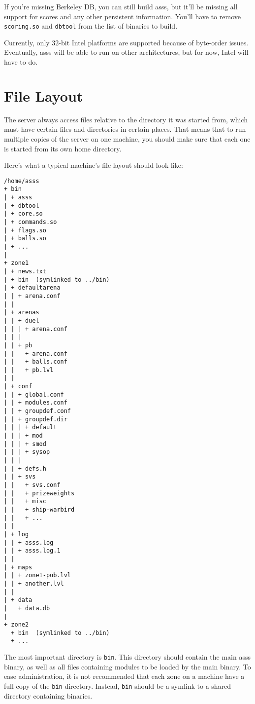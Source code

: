 \documentclass{article}
\newcommand{\asss}{asss}
\begin{document}
If you're missing Berkeley DB, you can still build \asss{}, but it'll be
missing all support for scores and any other persistent information.
You'll have to remove \verb/scoring.so/ and \verb/dbtool/ from the list
of binaries to build.

Currently, only 32-bit Intel platforms are supported because of
byte-order issues. Eventually, \asss{} will be able to run on other
architectures, but for now, Intel will have to do.


%
%
%


\section{File Layout}
The server always access files relative to the directory it was started
from, which must have certain files and directories in certain places.
That means that to run multiple copies of the server on one machine, you
should make sure that each one is started from its own home directory.

Here's what a typical machine's file layout should look like:
\begin{verbatim}
/home/asss
+ bin
| + asss
| + dbtool
| + core.so
| + commands.so
| + flags.so
| + balls.so
| + ...
|
+ zone1
| + news.txt
| + bin  (symlinked to ../bin)
| + defaultarena
| | + arena.conf
| |
| + arenas
| | + duel
| | | + arena.conf
| | |
| | + pb
| |   + arena.conf
| |   + balls.conf
| |   + pb.lvl
| |
| + conf
| | + global.conf
| | + modules.conf
| | + groupdef.conf
| | + groupdef.dir
| | | + default
| | | + mod
| | | + smod
| | | + sysop
| | |
| | + defs.h
| | + svs
| |   + svs.conf
| |   + prizeweights
| |   + misc
| |   + ship-warbird
| |   + ...
| |
| + log
| | + asss.log
| | + asss.log.1
| |
| + maps
| | + zone1-pub.lvl
| | + another.lvl
| |
| + data
|   + data.db
|
+ zone2
  + bin  (symlinked to ../bin)
  + ...
\end{verbatim}

The most important directory is \verb/bin/. This directory should
contain the main \asss{} binary, as well as all files containing modules
to be loaded by the main binary. To ease administration, it is not
recommended that each zone on a machine have a full copy of the
\verb/bin/ directory. Instead, \verb/bin/ should be a symlink to a
shared directory containing binaries.
\end{document}
